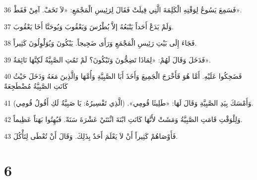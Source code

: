 \par 36 فَسَمِعَ يَسُوعُ لِوَقْتِهِ الْكَلِمَةَ الَّتِي قِيلَتْ فَقَالَ لِرَئِيسِ الْمَجْمَعِ: «لاَ تَخَفْ. آمِنْ فَقَطْ».
\par 37 وَلَمْ يَدَعْ أَحَداً يَتْبَعُهُ إلاَّ بُطْرُسَ وَيَعْقُوبَ وَيُوحَنَّا أَخَا يَعْقُوبَ.
\par 38 فَجَاءَ إِلَى بَيْتِ رَئِيسِ الْمَجْمَعِ وَرَأَى ضَجِيجاً. يَبْكُونَ وَيُوَلْوِلُونَ كَثِيراً.
\par 39 فَدَخَلَ وَقَالَ لَهُمْ: «لِمَاذَا تَضِجُّونَ وَتَبْكُونَ؟ لَمْ تَمُتِ الصَّبِيَّةُ لَكِنَّهَا نَائِمَةٌ».
\par 40 فَضَحِكُوا عَلَيْهِ. أَمَّا هُوَ فَأَخْرَجَ الْجَمِيعَ وَأَخَذَ أَبَا الصَّبِيَّةِ وَأُمَّهَا وَالَّذِينَ مَعَهُ وَدَخَلَ حَيْثُ كَانَتِ الصَّبِيَّةُ مُضْطَجِعَةً
\par 41 وَأَمْسَكَ بِيَدِ الصَّبِيَّةِ وَقَالَ لَهَا: «طَلِيثَا قُومِي». (الَّذِي تَفْسِيرُهُ: يَا صَبِيَّةُ لَكِ أَقُولُ قُومِي).
\par 42 وَلِلْوَقْتِ قَامَتِ الصَّبِيَّةُ وَمَشَتْ لأَنَّهَا كَانَتِ ابْنَةَ اثْنَتَيْ عَشْرَةَ سَنَةً. فَبُهِتُوا بَهَتاً عَظِيماً.
\par 43 فَأَوْصَاهُمْ كَثِيراً أَنْ لاَ يَعْلَمَ أَحَدٌ بِذَلِكَ. وَقَالَ أَنْ تُعْطَى لِتَأْكُلَ.

\chapter{6}

